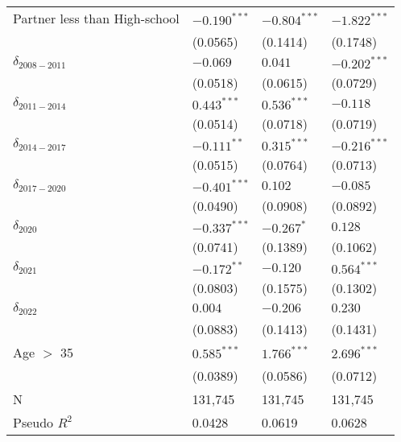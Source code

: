 \begin{tabular}{llll}
Partner less than High-school &     $-0.190^{***}$ &     $-0.804^{***}$ &     $-1.822^{***}$ \\
                              &           (0.0565) &           (0.1414) &           (0.1748) \\
$\delta_{2008-2011}$          &           $-0.069$ &            $0.041$ &     $-0.202^{***}$ \\
                              &           (0.0518) &           (0.0615) &           (0.0729) \\
$\delta_{2011-2014}$          &      $0.443^{***}$ &      $0.536^{***}$ &           $-0.118$ \\
                              &           (0.0514) &           (0.0718) &           (0.0719) \\
$\delta_{2014-2017}$          &      $-0.111^{**}$ &      $0.315^{***}$ &     $-0.216^{***}$ \\
                              &           (0.0515) &           (0.0764) &           (0.0713) \\
$\delta_{2017-2020}$          &     $-0.401^{***}$ &            $0.102$ &           $-0.085$ \\
                              &           (0.0490) &           (0.0908) &           (0.0892) \\
$\delta_{2020}$               &     $-0.337^{***}$ &         $-0.267^*$ &            $0.128$ \\
                              &           (0.0741) &           (0.1389) &           (0.1062) \\
$\delta_{2021}$               &      $-0.172^{**}$ &           $-0.120$ &      $0.564^{***}$ \\
                              &           (0.0803) &           (0.1575) &           (0.1302) \\
$\delta_{2022}$               &            $0.004$ &           $-0.206$ &            $0.230$ \\
                              &           (0.0883) &           (0.1413) &           (0.1431) \\
Age $>$ 35                    &      $0.585^{***}$ &      $1.766^{***}$ &      $2.696^{***}$ \\
                              &           (0.0389) &           (0.0586) &           (0.0712) \\
N                             &            131,745 &            131,745 &            131,745 \\
Pseudo $R^2$                  &             0.0428 &             0.0619 &             0.0628 \\
\bottomrule
\end{tabular}
